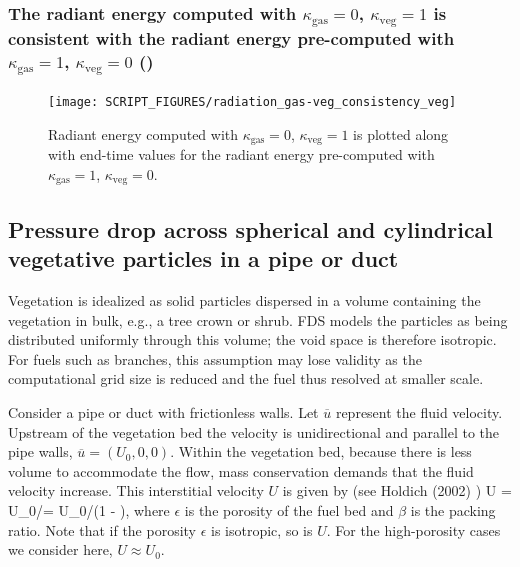 \documentclass[11pt]{book}
\begin{document}
\pagebreak

\subsubsection{The radiant energy computed with $\kappa_{\mathrm{gas}}
  = 0$, $\kappa_{\mathrm{veg}} = 1$ is consistent with
 the radiant energy pre-computed with $\kappa_{\mathrm{gas}} = 1$,
$\kappa_{\mathrm{veg}} = 0$ (\texorpdfstring{}{radiation\_gas-veg\_consistency\_veg})}
\label{radiation_gas-veg_consistency_veg}

\begin{figure}[ht]
\centering
\texttt{[image: SCRIPT\_FIGURES/radiation\_gas-veg\_consistency\_veg]}
\caption[ test case.]{Radiant energy computed with $\kappa_{\mathrm{gas}}
  = 0$, $\kappa_{\mathrm{veg}} = 1$ is plotted along with end-time values
  for the radiant energy pre-computed with  $\kappa_{\mathrm{gas}} = 1$,
$\kappa_{\mathrm{veg}} = 0$.}
\label{fig_radiation_gas-veg_consistency_veg}
\end{figure}

\subsection{Pressure drop  across spherical and cylindrical vegetative
  particles in a pipe or duct}
\label{vege_pressure-drop}
Vegetation is idealized as solid particles dispersed in a volume
containing the vegetation in bulk, e.g., a tree crown or shrub.
FDS models the particles as being distributed uniformly through this
volume; the void space is therefore isotropic. For fuels such as
branches, this assumption may lose validity as
the computational grid size is reduced and the fuel thus resolved at
smaller scale.

Consider a pipe or duct with frictionless walls.  Let $\overline{u}$
represent the fluid velocity. Upstream of the vegetation bed the
velocity is unidirectional and parallel to the pipe walls,
$\overline{u} = (U_0, 0, 0)$.  Within the
vegetation bed, because there is less volume to accommodate the flow,
mass conservation demands that the fluid velocity increase.   This
interstitial velocity $U$ is given by (see Holdich (2002) \cite{Holdich:2002})
\be
 U = U_0/\epsilon = U_0/(1 - \beta),
\label{eq:interstitial velocity}
\ee
where $\epsilon$ is the porosity of the fuel bed and $\beta$ is the
packing ratio.  Note that if the porosity $\epsilon$ is isotropic, so
is $U$. For the high-porosity cases we consider here, $U \approx U_0$.
\end{document}
